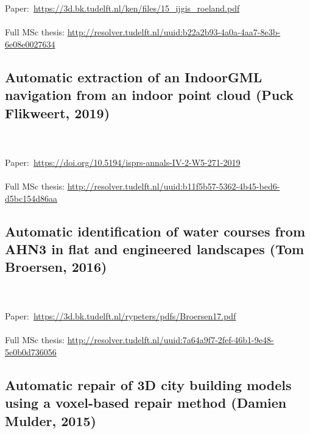\begin{kaobox}[frametitle=\faExternalLink\ To read or to watch.]
\\ \\
Paper:\ \url{https://3d.bk.tudelft.nl/ken/files/15_ijgis_roeland.pdf}
\\ \\
Full MSc thesis: \url{http://resolver.tudelft.nl/uuid:b22a2b93-4a0a-4aa7-8e3b-6e08e0027634}
\end{kaobox}

\subsection{Automatic extraction of an IndoorGML navigation from an indoor point cloud (Puck Flikweert, 2019)}

\begin{kaobox}[frametitle=\faExternalLink\ To read or to watch.]
\\ \\
Paper:\ \url{https://doi.org/10.5194/isprs-annals-IV-2-W5-271-2019}
\\ \\
Full MSc thesis: \url{http://resolver.tudelft.nl/uuid:b11f5b57-5362-4b45-bed6-d5bc154d86aa}
\end{kaobox}

\subsection{Automatic identification of water courses from AHN3 in flat and engineered landscapes (Tom Broersen, 2016)}

\begin{kaobox}[frametitle=\faExternalLink\ To read or to watch.]
\\ \\
Paper:\ \url{https://3d.bk.tudelft.nl/rypeters/pdfs/Broersen17.pdf}
\\ \\
Full MSc thesis: \url{http://resolver.tudelft.nl/uuid:7a64a9f7-2fef-46b1-9e48-5e0b0d736056}
\end{kaobox}

\subsection{Automatic repair of 3D city building models using a voxel-based repair method (Damien Mulder, 2015)}


